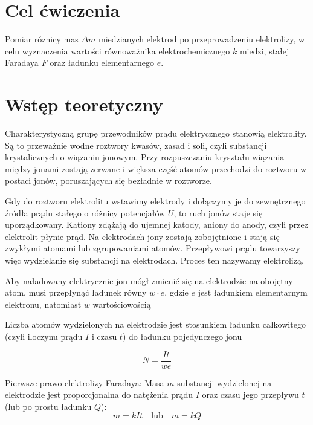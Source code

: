 \documentclass{fizykalab}
\begin{document}
\maketitle

\section{Cel ćwiczenia}
Pomiar róznicy mas $\Delta m$ miedzianych elektrod po
przeprowadzeniu elektrolizy, w celu wyznaczenia wartości
równoważnika elektrochemicznego $k$ miedzi, stałej Faradaya
$F$ oraz ładunku elementarnego $e$.

\section{Wstęp teoretyczny}
Charakterystyczną grupę przewodników prądu elektrycznego stanowią elektrolity. Są to
przeważnie wodne roztwory kwasów, zasad i soli, czyli substancji krystalicznych o wiązaniu
jonowym. Przy rozpuszczaniu kryształu wiązania między jonami zostają zerwane i większa
część atomów przechodzi do roztworu w postaci jonów, poruszających się bezładnie
w roztworze.

Gdy do roztworu elektrolitu wstawimy elektrody i dołączymy je do zewnętrznego
źródła prądu stałego o różnicy potencjałów $U$, to ruch jonów staje się uporządkowany.
Kationy zdążają do ujemnej katody, aniony do anody, czyli przez elektrolit płynie prąd. Na
elektrodach jony zostają zobojętnione i stają się zwykłymi atomami lub zgrupowaniami
atomów. Przepływowi prądu towarzyszy więc wydzielanie się substancji na elektrodach.
Proces ten nazywamy elektrolizą. 

Aby naładowany elektrycznie jon mógł zmienić się na elektrodzie na obojętny atom,
musi przepłynąć ładunek równy $w\cdot e$,
gdzie $e$ jest ładunkiem elementarnym elektronu,
natomiast $w$ wartościowością

Liczba atomów wydzielonych na elektrodzie jest stosunkiem ładunku całkowitego
(czyli iloczynu prądu $I$ i czasu $t$) do ładunku pojedynczego jonu 

\begin{equation}
    N = \frac{It}{we}
\end{equation}

Pierwsze prawo elektrolizy Faradaya: Masa $m$ substancji
wydzielonej na elektrodzie jest proporcjonalna
do natężenia prądu $I$ oraz czasu jego
przepływu $t$ (lub po prostu ładunku $Q$):
\begin{equation}
    \label{eq:faraday1}
    m = kIt \quad \text{lub} \quad m = kQ
\end{equation}
\end{document}
